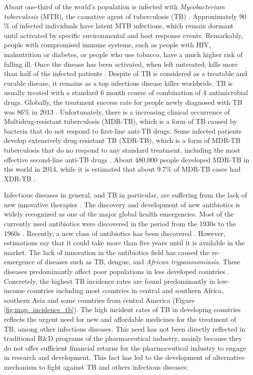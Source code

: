 \documentclass[11pt, b5paper,twoside]{tesi_upf}
\begin{document}
\par About one-third of the world's population is infected with \textit{Mycobacterium tuberculosis} (MTB), the causative agent of tuberculosis (TB) \cite{Lewandowski2015}. Approximately 90$\%$ of infected individuals have latent MTB infections, which remain dormant until activated by specific environmental and host response events. Remarkably, people with compromised immune systems, such as people with HIV, malnutrition or diabetes, or people who use tobacco, have a much higher risk of falling ill. Once the disease has been activated, when left untreated, kills more than half of the infected patients \cite{Connell2011}. Despite of TB is considered as a treatable and curable disease, it remains as a top infectious disease killer worldwide. TB is usually treated with a standard 6 month course of combination of 4 antimicrobial drugs. Globally, the treatment success rate for people newly diagnosed with TB was 86$\%$ in 2013 \cite{Lewandowski2015}. Unfortunately, there is a increasing clinical occurrence of Multidrug-resistant tuberculosis (MDR-TB), which is a form of TB caused by bacteria that do not respond to first-line anti-TB drugs. Some infected patients develop extensively drug-resistant TB (XDR-TB), which is a form of MDR-TB tuberculosis that do no respond to any standard treatment, including the most effective second-line anti-TB drugs \cite{Berry2009}. About 480,000 people developed MDR-TB in the world in 2014, while it is estimated that about 9.7$\%$ of MDR-TB cases had XDR-TB \cite{Lewandowski2015}.

\par Infectious diseases in general, and TB in particular, are suffering from the lack of new innovative therapies \cite{Trouiller2016}. The discovery and development of new antibiotics is widely recognized as one of the major global health emergencies. Most of the currently used antibiotics were discovered in the period from the 1930s to the 1960s \cite{Conly2005}. Recently, a new class of antibiotics has been discovered \cite{Ling2015a}. However, estimations say that it could take more than five years until it is available in the market. The lack of innovation in the antibiotics field has caused the re-emergence of diseases such  as  TB, dengue, and \textit{African trypanosomiasis.} These diseases predominantly  affect  poor  populations in less developed countries \cite{Trouiller2016}. Concretely, the highest TB incidence rates are found predominantly in low-income countries including most countries in central and southern Africa, southern Asia and some countries from central America (Figure \ref{fig:map_incidence_tb}). The high incident rates of TB in developing countries reflects the urgent need for new and affordable medicines for the treatment of TB, among other infectious diseases. This need has not been directly reflected in traditional R$\&$D programs of the pharmaceutical industry, mainly because they do not offer sufficient financial returns for the pharmaceutical industry  to engage in research and development. This fact has led to the development of alternative mechanism to fight against TB and others infectious diseases:
\end{document}

